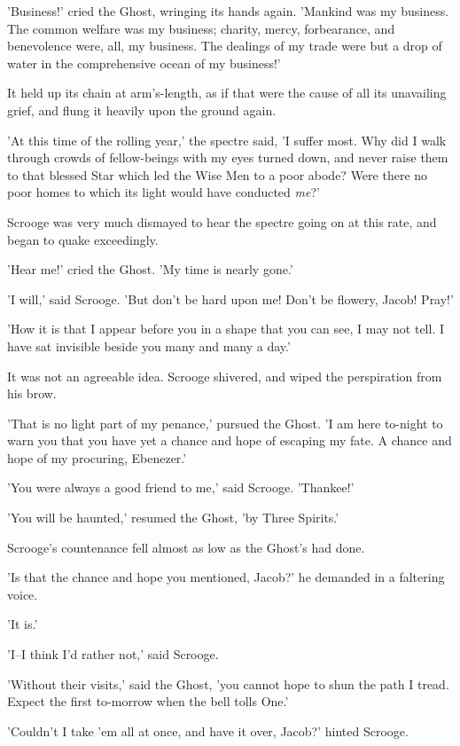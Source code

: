 'Business!' cried the Ghost, wringing its hands again. 'Mankind was my
business. The common welfare was my business; charity, mercy,
forbearance, and benevolence were, all, my business. The dealings of my
trade were but a drop of water in the comprehensive ocean of my
business!'

It held up its chain at arm's-length, as if that were the cause of all
its unavailing grief, and flung it heavily upon the ground again.

'At this time of the rolling year,' the spectre said, 'I suffer most.
Why did I walk through crowds of fellow-beings with my eyes turned down,
and never raise them to that blessed Star which led the Wise Men to a
poor abode? Were there no poor homes to which its light would have
conducted \emph{me}?'

Scrooge was very much dismayed to hear the spectre going on at this
rate, and began to quake exceedingly.

'Hear me!' cried the Ghost. 'My time is nearly gone.'

'I will,' said Scrooge. 'But don't be hard upon me! Don't be flowery,
Jacob! Pray!'

'How it is that I appear before you in a shape that you can see, I may
not tell. I have sat invisible beside you many and many a day.'

It was not an agreeable idea. Scrooge shivered, and wiped the
perspiration from his brow.

'That is no light part of my penance,' pursued the Ghost. 'I am here
to-night to warn you that you have yet a chance and hope of escaping my
fate. A chance and hope of my procuring, Ebenezer.'

'You were always a good friend to me,' said Scrooge. 'Thankee!'

'You will be haunted,' resumed the Ghost, 'by Three Spirits.'

Scrooge's countenance fell almost as low as the Ghost's had done.

'Is that the chance and hope you mentioned, Jacob?' he demanded in a
faltering voice.

'It is.'

'I--I think I'd rather not,' said Scrooge.

'Without their visits,' said the Ghost, 'you cannot hope to shun the
path I tread. Expect the first to-morrow when the bell tolls One.'

'Couldn't I take 'em all at once, and have it over, Jacob?' hinted
Scrooge.

